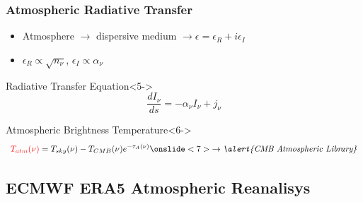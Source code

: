 \documentclass[10pt,aspectratio=169]{beamer}
\begin{document}
\begin{frame}
\frametitle{Atmospheric Radiative Transfer}

\begin{itemize}
\item<1-3,5-> Atmosphere $\rightarrow$ \alert{dispersive} medium $\rightarrow \epsilon = \epsilon_R + i\epsilon_I$
\item<2-3,5-> $\epsilon_R \propto \sqrt{n_\nu}$,
          \quad $\epsilon_I \propto \alpha_\nu$ 
\end{itemize}


\begin{block}{Radiative Transfer Equation}<5->
\begin{equation}
\frac{dI_\nu}{ds} = -\alpha_\nu I_\nu + j_\nu
\end{equation}
\end{block}

\begin{block}{Atmospheric Brightness Temperature}<6->%
\begin{equation}
\textcolor{red}{T_{atm}(\nu)} = T_{sky}(\nu) - T_{CMB}(\nu)e^{-\tau_A(\nu)}%
\onslide<7>{\rightarrow \textit{\alert{CMB Atmospheric Library}}}%
\end{equation}%
\end{block}%

\end{frame}

\subsection{ECMWF ERA5 Atmospheric Reanalisys}
\end{document}
